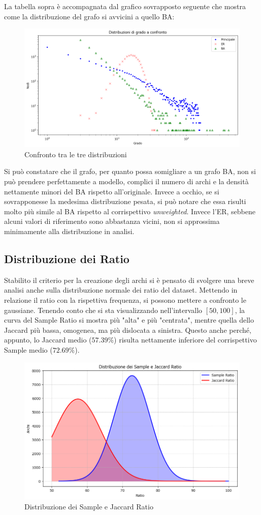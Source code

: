 \documentclass[sigchi]{acmart}
\begin{document}
\noindent La tabella sopra è accompagnata dal grafico sovrapposto seguente che mostra come la distribuzione del grafo si avvicini a quello BA:

\begin{figure}[H]
\centering
\includegraphics[width=0.45
\textwidth]{../network_analysis/plots/2_2/grComparison.png}
\caption{Confronto tra le tre distribuzioni}
\label{fig:grComparison}
\end{figure}

\noindent Si può constatare che il grafo, per quanto possa somigliare a un grafo BA, non si può prendere perfettamente a modello, complici il numero di archi e la densità nettamente minori del BA rispetto all'originale. Invece a occhio, se si sovrapponesse la medesima distribuzione pesata, si può notare che essa risulti molto più simile al BA rispetto al corrispettivo {\itshape unweighted}. Invece l'ER, sebbene alcuni valori di riferimento sono abbastanza vicini, non si approssima minimamente alla distribuzione in analisi.

\subsection{Distribuzione dei Ratio}

Stabilito il criterio per la creazione degli archi si è pensato di svolgere una breve analisi anche sulla distribuzione normale dei ratio del dataset. Mettendo in relazione il ratio con la rispettiva frequenza, si possono mettere a confronto le gaussiane. Tenendo conto che si sta visualizzando nell'intervallo $[50,100]$, la curva del Sample Ratio si mostra più "alta" e più "centrata", mentre quella dello Jaccard più bassa, omogenea, ma più dislocata a sinistra. Questo anche perché, appunto, lo Jaccard medio ($57.39\%$) risulta nettamente inferiore del corrispettivo Sample medio ($72.69\%$).

\begin{figure}[H]
\centering
\includegraphics[width=0.45
\textwidth]{../network_analysis/plots/2_3/rtDist.png}
\caption{Distribuzione dei Sample e Jaccard Ratio}
\label{fig:rtDist}
\end{figure}
\end{document}
